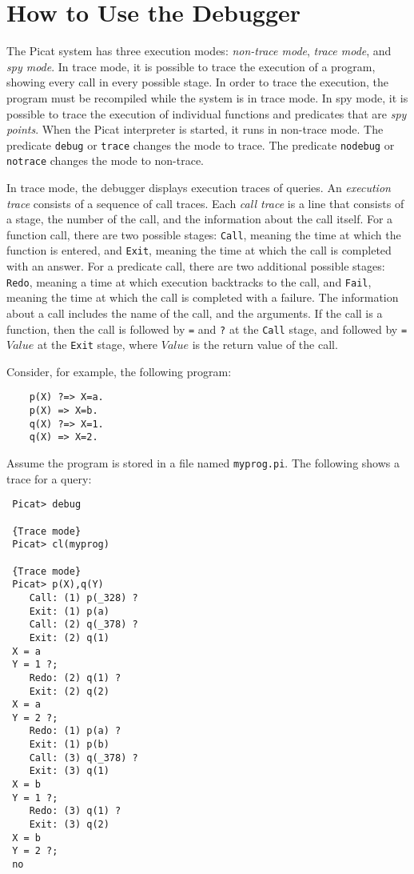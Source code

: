 \section{How to Use the Debugger}
The Picat system has three execution modes: \textit{non-trace mode}, \textit{trace mode}, and \textit{spy mode}.  In trace mode, it is possible to trace the execution of a program, showing every call in every possible stage.  In order to trace the execution, the program must be recompiled while the system is in trace mode.  In spy mode, it is possible to trace the execution of individual functions and predicates that are {\it spy points}. When the Picat interpreter is started, it runs in non-trace mode. The predicate \texttt{debug} or \texttt{trace}  changes the mode to trace. The predicate \texttt{nodebug} or \texttt{notrace} changes the mode to non-trace.

In trace mode, the debugger displays execution traces of queries. An \emph{execution trace} consists of a sequence of call traces. Each \emph{call trace} is a line that consists of a stage, the number of the call, and the information about the call itself. For a function call, there are two possible stages: \texttt{Call}, meaning the time at which the function is entered, and \texttt{Exit},  meaning the time at which the call is completed with an answer. For a predicate call, there are two additional possible stages: \texttt{Redo}, meaning a time at which execution backtracks to the call, and \texttt{Fail}, meaning the time at which the call is completed with a failure. The information about a call includes the name of the call, and the arguments. If the call is a function, then the call is followed by \texttt{=} and \texttt{?} at the \texttt{Call} stage, and followed by \texttt{= $Value$} at the \texttt{Exit} stage, where $Value$ is the return value of the call. 

Consider, for example, the following program:
\begin{verbatim}
    p(X) ?=> X=a.
    p(X) => X=b.
    q(X) ?=> X=1.
    q(X) => X=2.
\end{verbatim}
Assume the program is stored in a file named \texttt{myprog.pi}. The following shows a trace for a query:
\begin{verbatim}
 Picat> debug

 {Trace mode}
 Picat> cl(myprog)

 {Trace mode}
 Picat> p(X),q(Y)  
    Call: (1) p(_328) ?
    Exit: (1) p(a) 
    Call: (2) q(_378) ?
    Exit: (2) q(1) 
 X = a
 Y = 1 ?;
    Redo: (2) q(1) ?
    Exit: (2) q(2) 
 X = a
 Y = 2 ?;
    Redo: (1) p(a) ?
    Exit: (1) p(b) 
    Call: (3) q(_378) ?
    Exit: (3) q(1) 
 X = b
 Y = 1 ?;
    Redo: (3) q(1) ?
    Exit: (3) q(2) 
 X = b
 Y = 2 ?;
 no
\end{verbatim}

